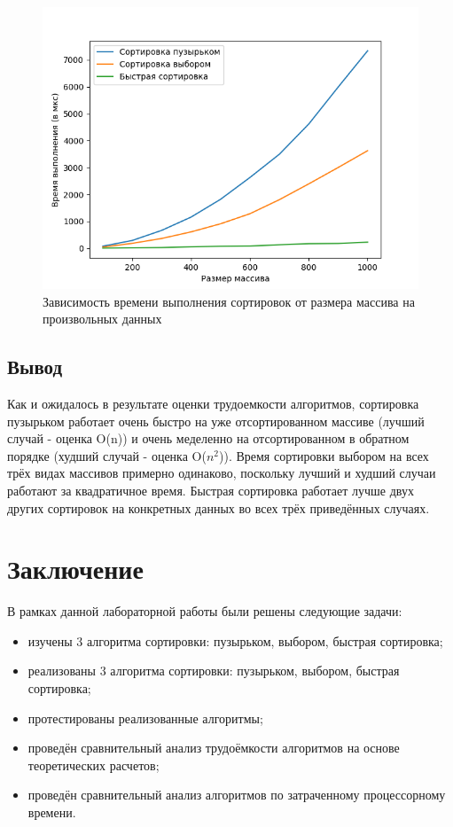 \documentclass[12pt]{report}
\begin{document}
\begin{figure}[H]
	\centering
	\includegraphics[scale = 0.8]{rand.png}
	\caption{Зависимость времени выполнения сортировок от размера массива на произвольных данных}
	\label{fig:mpr3}
\end{figure}

\section{Вывод}

Как и ожидалось в результате оценки трудоемкости алгоритмов, сортировка пузырьком работает очень быстро на уже отсортированном массиве (лучший случай - оценка O(n)) и очень меделенно на отсортированном в обратном порядке (худший случай - оценка O($n^2$)). Время сортировки выбором на всех трёх видах массивов примерно одинаково, поскольку лучший и худший случаи работают за квадратичное время. Быстрая сортировка работает лучше двух других сортировок на конкретных данных во всех трёх приведённых случаях.


\chapter*{Заключение}

В рамках данной лабораторной работы были решены следующие задачи:

\begin{itemize}
	\item изучены 3 алгоритма сортировки: пузырьком, выбором, быстрая сортировка;
	\item реализованы 3 алгоритма сортировки: пузырьком, выбором, быстрая сортировка;
	\item протестированы реализованные алгоритмы;
	\item проведён сравнительный анализ трудоёмкости алгоритмов на основе теоретических расчетов;
	\item проведён сравнительный анализ алгоритмов по затраченному процессорному времени.
\end{itemize}
\end{document}
